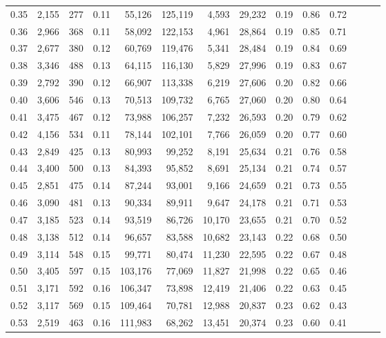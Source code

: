 \begin{tabular}{rrrrrrrrrrrrrr}
0.35 &  2,155 &  277 &  0.11 &   55,126 &  125,119 &   4,593 &  29,232 &  0.19 &  0.86 &      0.72 \\
0.36 &  2,966 &  368 &  0.11 &   58,092 &  122,153 &   4,961 &  28,864 &  0.19 &  0.85 &      0.71 \\
0.37 &  2,677 &  380 &  0.12 &   60,769 &  119,476 &   5,341 &  28,484 &  0.19 &  0.84 &      0.69 \\
0.38 &  3,346 &  488 &  0.13 &   64,115 &  116,130 &   5,829 &  27,996 &  0.19 &  0.83 &      0.67 \\
0.39 &  2,792 &  390 &  0.12 &   66,907 &  113,338 &   6,219 &  27,606 &  0.20 &  0.82 &      0.66 \\
0.40 &  3,606 &  546 &  0.13 &   70,513 &  109,732 &   6,765 &  27,060 &  0.20 &  0.80 &      0.64 \\
0.41 &  3,475 &  467 &  0.12 &   73,988 &  106,257 &   7,232 &  26,593 &  0.20 &  0.79 &      0.62 \\
0.42 &  4,156 &  534 &  0.11 &   78,144 &  102,101 &   7,766 &  26,059 &  0.20 &  0.77 &      0.60 \\
0.43 &  2,849 &  425 &  0.13 &   80,993 &   99,252 &   8,191 &  25,634 &  0.21 &  0.76 &      0.58 \\
0.44 &  3,400 &  500 &  0.13 &   84,393 &   95,852 &   8,691 &  25,134 &  0.21 &  0.74 &      0.57 \\
0.45 &  2,851 &  475 &  0.14 &   87,244 &   93,001 &   9,166 &  24,659 &  0.21 &  0.73 &      0.55 \\
0.46 &  3,090 &  481 &  0.13 &   90,334 &   89,911 &   9,647 &  24,178 &  0.21 &  0.71 &      0.53 \\
0.47 &  3,185 &  523 &  0.14 &   93,519 &   86,726 &  10,170 &  23,655 &  0.21 &  0.70 &      0.52 \\
0.48 &  3,138 &  512 &  0.14 &   96,657 &   83,588 &  10,682 &  23,143 &  0.22 &  0.68 &      0.50 \\
0.49 &  3,114 &  548 &  0.15 &   99,771 &   80,474 &  11,230 &  22,595 &  0.22 &  0.67 &      0.48 \\
0.50 &  3,405 &  597 &  0.15 &  103,176 &   77,069 &  11,827 &  21,998 &  0.22 &  0.65 &      0.46 \\
0.51 &  3,171 &  592 &  0.16 &  106,347 &   73,898 &  12,419 &  21,406 &  0.22 &  0.63 &      0.45 \\
0.52 &  3,117 &  569 &  0.15 &  109,464 &   70,781 &  12,988 &  20,837 &  0.23 &  0.62 &      0.43 \\
0.53 &  2,519 &  463 &  0.16 &  111,983 &   68,262 &  13,451 &  20,374 &  0.23 &  0.60 &      0.41 \\

\end{tabular}
